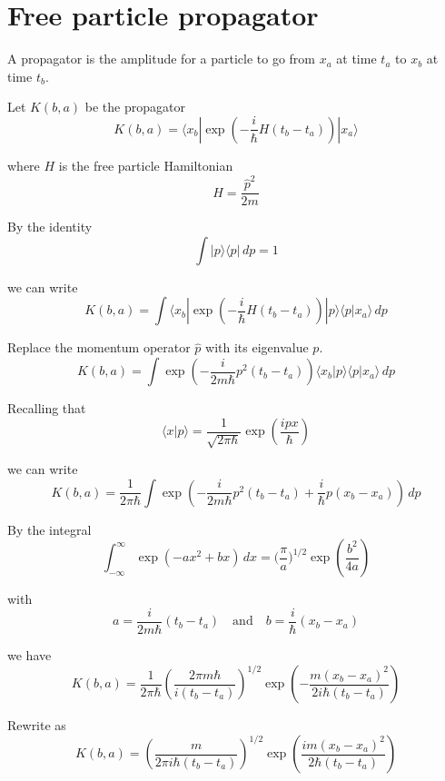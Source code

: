 

\section*{Free particle propagator}
A propagator is the amplitude for a particle to go from $x_a$
at time $t_a$ to $x_b$ at time $t_b$.

\bigskip
Let $K(b,a)$ be the propagator
$$
K(b,a)=\langle x_b|\exp\left(-\frac{i}{\hbar}H(t_b-t_a)\right)|x_a\rangle
$$

where $H$ is the free particle Hamiltonian
$$
H=\frac{\hat p^2}{2m}
$$

By the identity
$$
\int|p\rangle\langle p|\,dp=1
$$

we can write
$$
K(b,a)=\int\langle x_b|\exp\left(-\frac{i}{\hbar}H(t_b-t_a)\right)|p\rangle\langle p|x_a\rangle\,dp
$$

Replace the momentum operator $\hat p$ with its eigenvalue $p$.
$$
K(b,a)=\int\exp\left(-\frac{i}{2m\hbar}p^2(t_b-t_a)\right)\langle x_b|p\rangle\langle p|x_a\rangle\,dp
$$

Recalling that
$$
\langle x|p\rangle=\frac{1}{\sqrt{2\pi\hbar}}\exp\left(\frac{ipx}{\hbar}\right)
$$

we can write
$$
K(b,a)=\frac{1}{2\pi\hbar}
\int\exp\left(-\frac{i}{2m\hbar}p^2(t_b-t_a)+\frac{i}{\hbar}p(x_b-x_a)\right)\,dp
$$

By the integral
$$
\int_{-\infty}^\infty
\exp(-ax^2+bx)\,dx=\biggl(\frac{\pi}{a}\biggr)^{1/2}\exp\left(\frac{b^2}{4a}\right)
$$

with
$$
a=\frac{i}{2m\hbar}(t_b-t_a)\quad\text{and}\quad b=\frac{i}{\hbar}(x_b-x_a)
$$

we have
$$
K(b,a)=\frac{1}{2\pi\hbar}
\left(\frac{2\pi m\hbar}{i(t_b-t_a)}\right)^{1/2}
\exp\left(-\frac{m(x_b-x_a)^2}{2i\hbar(t_b-t_a)}\right)
$$

Rewrite as
$$
K(b,a)=
\left(\frac{m}{2\pi i\hbar(t_b-t_a)}\right)^{1/2}
\exp\left(\frac{im(x_b-x_a)^2}{2\hbar(t_b-t_a)}\right)
$$


